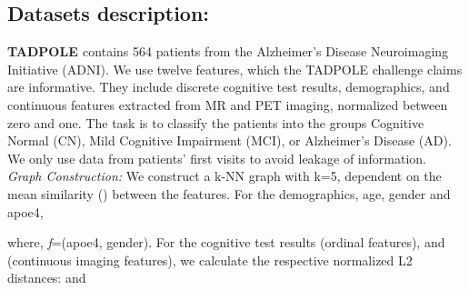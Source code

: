 \documentclass[runningheads]{llncs}
\begin{document}
\subsection{Datasets description:}
\textbf{TADPOLE \cite{tadpole}} contains 564 patients from the Alzheimer’s Disease Neuroimaging Initiative (ADNI). We use twelve features, which the TADPOLE challenge claims are informative. They include discrete cognitive test results, demographics, and continuous features extracted from MR and PET imaging, normalized between zero and one. The task is to classify the patients into the groups Cognitive Normal (CN), Mild Cognitive Impairment (MCI), or Alzheimer’s Disease (AD). We only use data from patients' first visits to avoid leakage of information.\\
\textit{Graph Construction:}
We construct a k-NN graph with k=5, dependent on the mean similarity () between the features. For the demographics, age, gender and apoe4,

where, \textit{f}=(apoe4, gender).
For the cognitive test results  (ordinal features), and  (continuous imaging features), we calculate the respective normalized L2 distances:
 and
\end{document}
